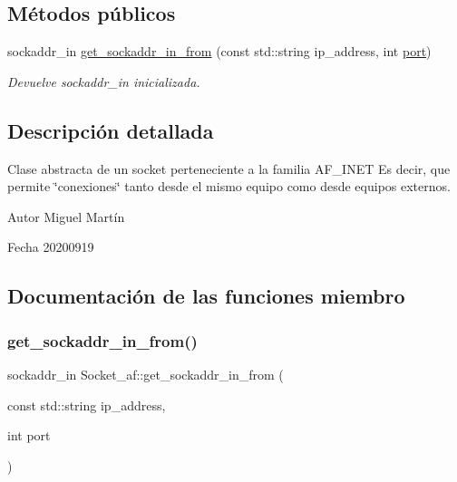 \subsection*{Métodos públicos}
\begin{DoxyCompactItemize}
\item 
sockaddr\+\_\+in \hyperlink{classSocket__af_aa2f8fb1398c1e6f66832151e8c5bcf2e}{get\+\_\+sockaddr\+\_\+in\+\_\+from} (const std\+::string ip\+\_\+address, int \hyperlink{classSocket__base_afcdd7ae81a9fb867d012b7db8c259576}{port})
\begin{DoxyCompactList}\small\item\em Devuelve sockaddr\+\_\+in inicializada. \end{DoxyCompactList}\end{DoxyCompactItemize}


\subsection{Descripción detallada}
Clase abstracta de un socket perteneciente a la familia A\+F\+\_\+\+I\+N\+ET Es decir, que permite \char`\"{}conexiones\char`\"{} tanto desde el mismo equipo como desde equipos externos. 

\begin{DoxyAuthor}{Autor}
Miguel Martín 
\end{DoxyAuthor}
\begin{DoxyDate}{Fecha}
20200919 
\end{DoxyDate}


\subsection{Documentación de las funciones miembro}
\mbox{\label{classSocket__af_aa2f8fb1398c1e6f66832151e8c5bcf2e}} 
\subsubsection{\texorpdfstring{get\+\_\+sockaddr\+\_\+in\+\_\+from()}{get\_sockaddr\_in\_from()}}
{\footnotesize\ttfamily sockaddr\+\_\+in Socket\+\_\+af\+::get\+\_\+sockaddr\+\_\+in\+\_\+from (\begin{DoxyParamCaption}\item[{const std\+::string}]{ip\+\_\+address,  }\item[{int}]{port }\end{DoxyParamCaption})\hspace{0.3cm}{\ttfamily [virtual]}}



